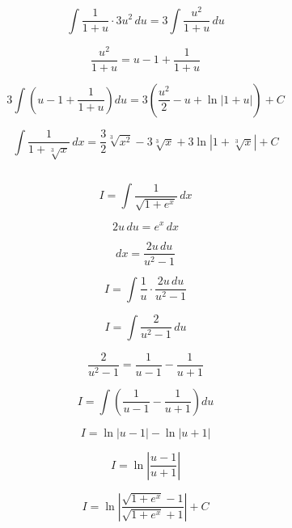 \documentclass[12pt]{article}
\begin{document}
	\[
	\int \frac{1}{1 + u} \cdot 3u^2 \, du = 3 \int \frac{u^2}{1 + u} \, du
	\]
	

	
	\[
	\frac{u^2}{1 + u} = u - 1 + \frac{1}{1 + u}
	\]
	

	
	\[
	3 \int \left( u - 1 + \frac{1}{1 + u} \right) du = 3 \left( \frac{u^2}{2} - u + \ln |1 + u| \right) + C
	\]
	

	
	\[
	\int \frac{1}{1 + \sqrt[3]{x}} \, dx = \frac{3}{2} \sqrt[3]{x^2} - 3 \sqrt[3]{x} + 3 \ln |1 + \sqrt[3]{x}| + C
	\]
	




\subsection{}	

	\[
	I = \int \frac{1}{\sqrt{1+e^x}} \, dx
	\]
	

	
	\[
	2u \, du = e^x \, dx
	\]
	

	
	\[
	dx = \frac{2u \, du}{u^2 - 1}
	\]
	

	
	\[
	I = \int \frac{1}{u} \cdot \frac{2u \, du}{u^2 - 1}
	\]
	

	
	\[
	I = \int \frac{2}{u^2 - 1} \, du
	\]
	

	
	\[
	\frac{2}{u^2 - 1} = \frac{1}{u - 1} - \frac{1}{u + 1}
	\]
	

	
	\[
	I = \int \left( \frac{1}{u - 1} - \frac{1}{u + 1} \right) du
	\]
	

	
	\[
	I = \ln|u - 1| - \ln|u + 1|
	\]
	

	
	\[
	I = \ln \left| \frac{u - 1}{u + 1} \right|
	\]
	

	
	\[
	I = \ln \left| \frac{\sqrt{1 + e^x} - 1}{\sqrt{1 + e^x} + 1} \right| + C
	\]
	
\end{document}

